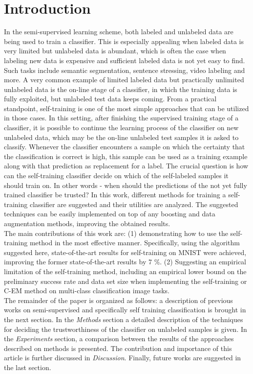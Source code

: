 \documentclass[conference, letterpaper]{IEEEtran}
\begin{document}
\section{Introduction}
In the semi-supervised learning scheme, both labeled and unlabeled data are being used to train a classifier. This is especially appealing when labeled data is very limited but unlabeled data is abundant, which is often the case when labeling new data is expensive and sufficient labeled data is not yet easy to find. Such tasks include semantic segmentation, sentence stressing, video labeling and more.
A very common example of limited labeled data but practically unlimited unlabeled data is the on-line stage of a classifier, in which the training data is fully exploited, but unlabeled test data keeps coming.
From a practical standpoint, self-training is one of the most simple approaches that can be utilized in those cases. 
 In this setting, after finishing the supervised training stage of a classifier, it is possible to continue the learning process of the classifier on new unlabeled data, which may be the on-line unlabeled test samples it is asked to classify. Whenever the classifier encounters a sample on which the certainty that the classification is correct is high, this sample can be used as a training example along with that prediction as replacement for a label.
 The crucial question is how can the self-training classifier decide on which of the self-labeled samples it should train on. In other words - when should the predictions of the not yet fully trained classifier be trusted?
 In this work, different methods for training a self-training classifier are suggested and their utilities are analyzed. The suggested techniques can be easily implemented on top of any boosting and data augmentation methods, improving the obtained results.\\
 The main contributions of this work are: (1) demonstrating how to use the self-training method in the most effective manner. Specifically, using the algorithm suggested here, state-of-the-art results for self-training on MNIST were achieved, improving the former state-of-the-art results by 7 $\%$. (2) Suggesting an empirical limitation of the self-training method, including an empirical lower bound on the preliminary success rate and data set size when implementing the self-training or C-EM method on multi-class classification image tasks.\\
The remainder of the paper is organized as follows: a description of previous works on semi-supervised and specifically self training classification is brought in the next section. In the \textit{Methods} section a detailed description of the techniques for deciding the trustworthiness of the classifier on unlabeled samples is given. In the \textit{Experiments} section, a comparison between the results of the approaches described on methods is presented. The contribution and importance of this article is further discussed in \textit{Discussion}. Finally, future works are suggested in the last section.
\end{document}
